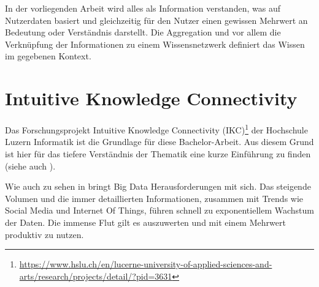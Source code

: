 
In der vorliegenden Arbeit wird alles als Information verstanden, was auf Nutzerdaten basiert und gleichzeitig für den Nutzer einen gewissen Mehrwert an Bedeutung oder Verständnis darstellt. Die Aggregation und vor allem die Verknüpfung der Informationen zu einem Wissensnetzwerk definiert das Wissen im gegebenen Kontext.








\section{Intuitive Knowledge Connectivity}\label{s-ikc}


Das Forschungsprojekt Intuitive Knowledge Connectivity (IKC)\footnote{\url{https://www.hslu.ch/en/lucerne-university-of-applied-sciences-and-arts/research/projects/detail/?pid=3631}} der Hochschule Luzern Informatik ist die Grundlage für diese Bachelor-Arbeit. Aus diesem Grund ist hier für das tiefere Verständnis der Thematik eine kurze Einführung zu finden (siehe auch \cite{kaufmann2016intuitive}).

Wie auch zu sehen in \cite{manyika2011big} bringt Big Data Herausforderungen mit sich. Das steigende Volumen und die immer detaillierten Informationen, zusammen mit Trends wie Social Media und Internet Of Things, führen schnell zu exponentiellem Wachstum der Daten. Die immense Flut gilt es auszuwerten und mit einem Mehrwert produktiv zu nutzen.

